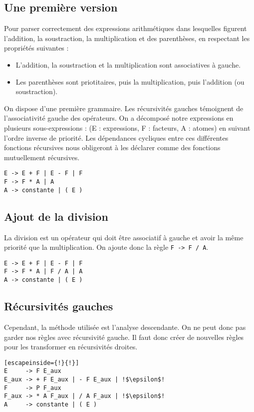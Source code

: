 \documentclass[11pt]{article}
\begin{document}
\subsection{Une première version}
Pour parser correctement des expressions arithmétiques dans lesquelles figurent l'addition, la soustraction, la multiplication et des parenthèses, en respectant les propriétés suivantes :
\begin{itemize}
\item L'addition, la soustraction et la multiplication sont associatives à gauche.
\item Les parenthèses sont priotitaires, puis la multiplication, puis l'addition (ou soustraction).
\end{itemize}

On dispose d'une première grammaire. Les récursivités gauches témoignent de l'associativité gauche des opérateurs. On a décomposé notre expressions en plusieurs sous-expressions : (E : expressions, F : facteurs, A : atomes) en suivant l'ordre inverse de priorité. Les dépendances cycliques entre ces différentes fonctions récursives nous obligeront à les déclarer comme des fonctions mutuellement récursives.

\begin{lstlisting}
E -> E + F | E - F | F
F -> F * A | A
A -> constante | ( E )
\end{lstlisting}

\subsection{Ajout de la division}
La division est un opérateur qui doit être associatif à gauche et avoir la même priorité que la multiplication. On ajoute donc la règle \texttt{F -> F / A}.
\begin{lstlisting}
E -> E + F | E - F | F
F -> F * A | F / A | A
A -> constante | ( E )
\end{lstlisting}

\subsection{Récursivités gauches}
Cependant, la méthode utilisée est l'analyse descendante. On ne peut donc pas garder nos règles avec récursivité gauche. Il faut donc créer de nouvelles règles pour les transformer en récursivités droites.

\begin{lstlisting}[escapeinside={!}{!}]
E     -> F E_aux
E_aux -> + F E_aux | - F E_aux | !$\epsilon$!
F     -> P F_aux
F_aux -> * A F_aux | / A F_aux | !$\epsilon$!
A     -> constante | ( E )
\end{lstlisting}
\end{document}
